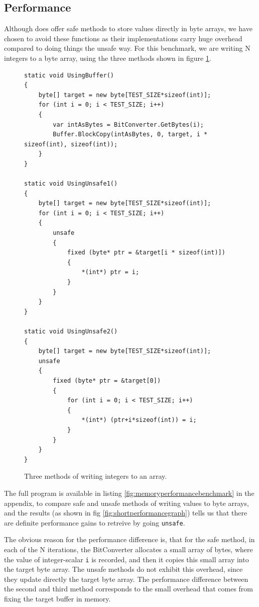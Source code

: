 \subsection{Performance}
\label{marshalunsafeperformance}
Although \csharp{} does offer safe methods to store values directly in byte
arrays, we have chosen to avoid these functions as their implementations carry
huge overhead compared to doing things the unsafe way.
For this benchmark, we are writing N integers to a byte array, using the three
methods shown in figure \ref{fig:threemethods}.
\begin{figure}
  \centering
  \begin{verbatim}
static void UsingBuffer()
{
    byte[] target = new byte[TEST_SIZE*sizeof(int)];
    for (int i = 0; i < TEST_SIZE; i++)
    {
        var intAsBytes = BitConverter.GetBytes(i);
        Buffer.BlockCopy(intAsBytes, 0, target, i * sizeof(int), sizeof(int)); 
    }
}

static void UsingUnsafe1()
{
    byte[] target = new byte[TEST_SIZE*sizeof(int)];
    for (int i = 0; i < TEST_SIZE; i++)
    {
        unsafe
        {
            fixed (byte* ptr = &target[i * sizeof(int)])
            {
                *(int*) ptr = i;
            }
        }
    }
}

static void UsingUnsafe2()
{
    byte[] target = new byte[TEST_SIZE*sizeof(int)];
    unsafe
    {
        fixed (byte* ptr = &target[0])
        {
            for (int i = 0; i < TEST_SIZE; i++)
            {
                *(int*) (ptr+i*sizeof(int)) = i;
            }
        }
    }
}

\end{verbatim}
  \caption{Three methods of writing integers to an array.}
  \label{fig:threemethods}
\end{figure}


The full program is available in listing \ref{fig:memoryperformancebenchmark} in the
appendix, to compare safe and unsafe methods of writing values to byte arrays, and the
results (as shown in fig \ref{fig:shortperformancegraph}) tells us that there
are definite performance gains to retreive by going \texttt{unsafe}.

The obvious reason for the performance difference is, that for the safe
method, in each of the N iterations, the BitConverter allocates a small 
array of bytes, where the value of integer-scalar {\tt i} is recorded,
and then it copies this small array into the target byte array. 
The unsafe methods do not exhibit this overhead, since they update directly
the target byte array. 
The performance difference between the second and third method corresponds to
the small overhead that comes from fixing the target buffer in memory.


